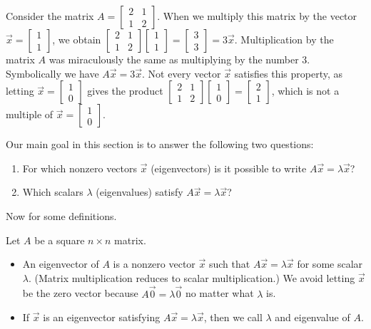 \begin{example}
Consider the matrix
$A=\begin{bmatrix} 2&1\\1&2\end{bmatrix} $.  When we multiply this matrix by the vector 
$\vec x = \begin{bmatrix} 1\\1\end{bmatrix} $, 
we obtain 
$\begin{bmatrix} 2&1\\1&2\end{bmatrix} \begin{bmatrix} 1\\1\end{bmatrix} = \begin{bmatrix} 3\\3\end{bmatrix}=3\vec x$. Multiplication by the matrix $A$ was miraculously the same as multiplying by the number 3. Symbolically we have $A\vec x = 3\vec x$. 
Not every vector $\vec x$ satisfies this property, as letting
$\vec x = \begin{bmatrix} 1\\0\end{bmatrix} $ 
gives  the product
$\begin{bmatrix} 2&1\\1&2\end{bmatrix} \begin{bmatrix} 1\\0\end{bmatrix} = \begin{bmatrix} 2\\1\end{bmatrix}$, which is not a multiple of $\vec x = \begin{bmatrix} 1\\0\end{bmatrix} $. 
 
\end{example}
Our main goal in this section is to answer the following two questions:
\begin{enumerate}
	\item For which nonzero vectors $\vec x$ (eigenvectors) is it possible to write $A\vec x = \lambda \vec x$?
	\item Which scalars $\lambda$ (eigenvalues) satisfy $A\vec x = \lambda \vec x$?
\end{enumerate}
Now for some definitions. 
\begin{definition}
Let $A$ be a square $n\times n$ matrix. 
\begin{itemize}
 \item An eigenvector of $A$ is a nonzero vector $\vec x$ such that $A\vec x =\lambda \vec x$ for some scalar {$\lambda$}. (Matrix multiplication reduces to scalar multiplication.) We avoid letting $\vec x$ be the zero vector because $A\vec 0=\lambda \vec 0$ no matter what $\lambda$ is.
 \item If $\vec x$ is an eigenvector satisfying $A\vec x = \lambda \vec x$, then we call $\lambda$ and eigenvalue of $A$.
\end{itemize}
\end{definition}


